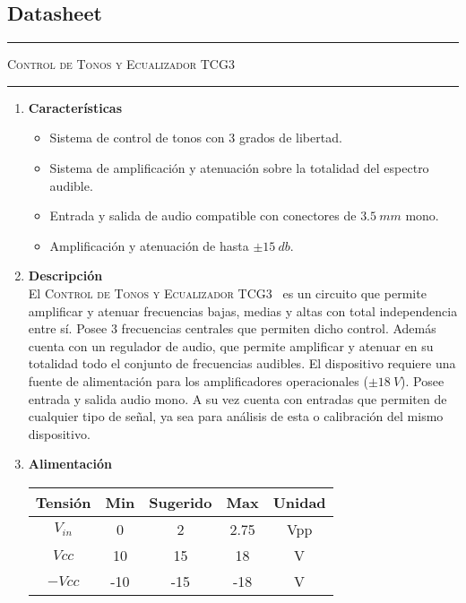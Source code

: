 \documentclass[a4paper]{article}
\begin{document}
\subsection{Datasheet}
\begin{center}
\rule{\textwidth}{1pt}
\textsc{Control de Tonos y Ecualizador TCG3 \textsuperscript{\textregistered}}
\rule{\textwidth}{1pt}
\end{center}

\begin{multicols}{2}

\begin{enumerate}
	\item[1] \textbf{Características}
	\begin{itemize}
		\item Sistema de control de tonos con 3 grados de libertad.
		\item Sistema de amplificación y atenuación sobre la totalidad del espectro audible.
		\item Entrada y salida de audio compatible con conectores de $3.5 \ mm$ mono.
		\item Amplificación y atenuación de hasta $\pm 15 \ db$.
	\end{itemize}
	
	\item[2] \textbf{Descripción}\\
		El \textsc{Control de Tonos y Ecualizador TCG3~\textsuperscript{\textregistered}} es un circuito que permite amplificar y atenuar frecuencias bajas, medias y altas con total independencia entre sí. Posee 3 frecuencias centrales que permiten dicho control. Además cuenta con un regulador de audio, que permite amplificar y atenuar en su totalidad todo el conjunto de frecuencias audibles. El dispositivo requiere una fuente de alimentación para los amplificadores operacionales ($\pm 18 \ V$). Posee entrada y salida audio mono. A su vez cuenta con entradas que permiten de cualquier tipo de señal, ya sea para análisis de esta o calibración del mismo dispositivo.
	
	\item[3] \textbf{Alimentación}
	\begin{table}[H]
		\begin{tabular}{ccccc}
			\hline	
			Tensión & Min & Sugerido & Max & Unidad \\
			\hline
			$V_{in}$    & 0 	& 2		   & 2.75	 	& Vpp \\
			$Vcc$       & 10  	& 15       & 18 	& V \\
			$-Vcc$      & -10 	& -15      & -18 	& V	\\
			\hline
		\end{tabular}
	\end{table}
		

\end{enumerate}
\end{multicols}
\end{document}
